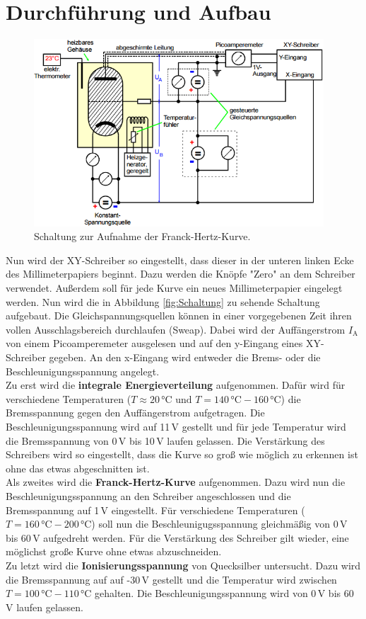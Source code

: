 \section{Durchführung und Aufbau}
\label{sec:Durchführung}

\begin{figure}[H]
  \centering
  \includegraphics[height=7cm]{picture/Schaltung}
  \caption{Schaltung zur Aufnahme der Franck-Hertz-Kurve. \cite[10]{sample}}
  \label{fig:Schaltung}
\end{figure}

Nun wird der XY-Schreiber so eingestellt, dass dieser in der unteren linken Ecke des Millimeterpapiers beginnt. Dazu werden die Knöpfe "Zero" an dem Schreiber verwendet. Außerdem soll für jede Kurve ein neues Millimeterpapier eingelegt werden. Nun wird die in Abbildung \eqref{fig:Schaltung} zu sehende Schaltung aufgebaut. Die Gleichspannungsquellen können in einer vorgegebenen Zeit ihren vollen Ausschlagsbereich durchlaufen (Sweap). Dabei wird der Auffängerstrom $I_\text{A}$ von einem Picoamperemeter ausgelesen und auf den y-Eingang eines XY-Schreiber gegeben. An den x-Eingang wird entweder die Brems- oder die Beschleunigungsspannung angelegt. \\
Zu erst wird die \textbf{integrale Energieverteilung} aufgenommen. Dafür wird für verschiedene Temperaturen ($T \approx 20\,\text{°C und } T = 140\,\text{°C} - 160\,\text{°C}$) die Bremsspannung gegen den Auffängerstrom aufgetragen. Die Beschleunigungsspannung wird auf 11\,V gestellt und für jede Temperatur wird die Bremsspannung von 0\,V bis 10\,V laufen gelassen. Die Verstärkung des Schreibers wird so eingestellt, dass die Kurve so groß wie möglich zu erkennen ist ohne das etwas abgeschnitten ist. \\
Als zweites wird die \textbf{Franck-Hertz-Kurve} aufgenommen. Dazu wird nun die Beschleunigungsspannung an den Schreiber angeschlossen und die Bremsspannung auf 1\,V eingestellt. Für verschiedene Temperaturen ($T = 160\,\text{°C} - 200\,\text{°C}$) soll nun die Beschleunigugsspannung gleichmäßig von 0\,V bis 60\,V aufgedreht werden. Für die Verstärkung des Schreiber gilt wieder, eine möglichst große Kurve ohne etwas abzuschneiden. \\
Zu letzt wird die \textbf{Ionisierungsspannung} von Quecksilber untersucht. Dazu wird die Bremsspannung auf auf -30\,V gestellt und die Temperatur wird zwischen $T = 100\,\text{°C} - 110\,\text{°C}$ gehalten. Die Beschleunigungsspannung wird von 0\,V bis 60\,V laufen gelassen.

